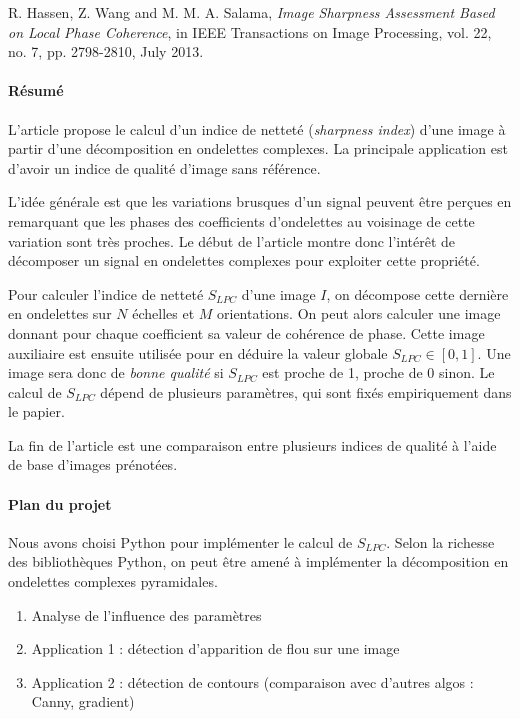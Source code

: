\documentclass[a4paper,12pt, openany, twoside]{article}
\theoremstyle{break}
\begin{document}
R. Hassen, Z. Wang and M. M. A. Salama, \textit{Image Sharpness Assessment Based on Local Phase Coherence}, in IEEE Transactions on Image Processing, vol. 22, no. 7, pp. 2798-2810, July 2013.
\paragraph{Résumé}

L'article propose le calcul d'un indice de netteté (\textit{sharpness index}) d'une image à partir d'une décomposition en ondelettes complexes. La principale application est d'avoir un indice de qualité d'image sans référence.

L'idée générale est que les variations brusques d'un signal peuvent être perçues en remarquant que les phases des coefficients d'ondelettes au voisinage de cette variation sont très proches. Le début de l'article montre donc l'intérêt de décomposer un signal en ondelettes complexes pour exploiter cette propriété.

Pour calculer l'indice de netteté $S_{LPC}$ d'une image $I$, on décompose cette dernière en ondelettes sur $N$ échelles et $M$ orientations. On peut alors calculer une image donnant pour chaque coefficient sa valeur de cohérence de phase. Cette image auxiliaire est ensuite utilisée pour en déduire la valeur globale $S_{LPC} \in [0, 1]$. Une image sera donc de \textit{bonne qualité} si $S_{LPC}$ est proche de 1, proche de 0 sinon. Le calcul de $S_{LPC}$ dépend de plusieurs paramètres, qui sont fixés empiriquement dans le papier.

La fin de l'article est une comparaison entre plusieurs indices de qualité à l'aide de base d'images prénotées.

%


\paragraph{Plan du projet}
Nous avons choisi Python pour implémenter le calcul de $S_{LPC}$. Selon la richesse des bibliothèques Python, on peut être amené à implémenter la décomposition en ondelettes complexes pyramidales.
\begin{enumerate}
  \item Analyse de l'influence des paramètres
  \item Application 1 : détection d'apparition de flou sur une image
  \item Application 2 : détection de contours (comparaison avec d'autres algos : Canny, gradient)
\end{enumerate}
\end{document}
